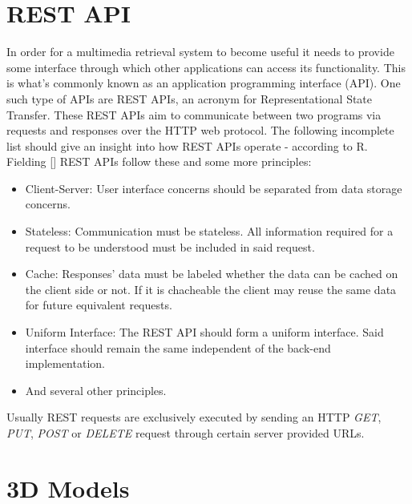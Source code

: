 \section{REST API}
\label{sec:rest_api_concept}

In order for a multimedia retrieval system to become useful it needs to provide some interface through which other applications can access its functionality. This is what's commonly known as an application programming interface (API). One such type of APIs are REST APIs, an acronym for Representational State Transfer. These REST APIs aim to communicate between two programs via requests and responses over the HTTP web protocol. The following incomplete list should give an insight into how REST APIs operate - according to R. Fielding [] REST APIs follow these and some more principles:
\begin{itemize}
	\item Client-Server: User interface concerns should be separated from data storage concerns.
	\item Stateless: Communication must be stateless. All information required for a request to be understood must be included in said request.
	\item Cache: Responses' data must be labeled whether the data can be cached on the client side or not. If it is chacheable the client may reuse the same data for future equivalent requests.
	\item Uniform Interface: The REST API should form a uniform interface. Said interface should remain the same independent of the back-end implementation.
	\item And several other principles.
\end{itemize}
Usually REST requests are exclusively executed by sending an HTTP \textit{GET}, \textit{PUT}, \textit{POST} or \textit{DELETE} request through certain server provided URLs.\\

\section{3D Models}
\label{sec:3D_models}

